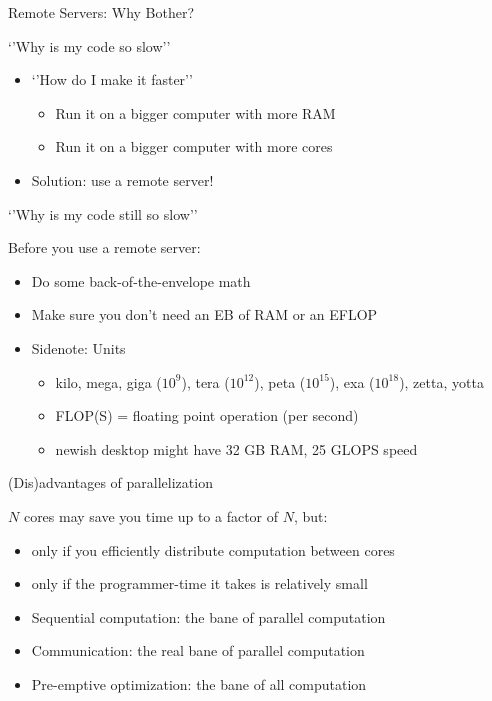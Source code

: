 \documentclass[ignorenonframetext,]{beamer}
\providecommand{\tightlist}{%
  \setlength{\itemsep}{0pt}\setlength{\parskip}{0pt}}
\begin{document}
\begin{frame}{Remote Servers: Why Bother?}
\begin{block}{`'Why is my code so slow''}
\begin{itemize}[<+->]
  \begin{itemize}[<+->]
  \tightlist
  \item
    You've run out of RAM
  \item
    Your computer just has too many operations to do
  \end{itemize}
\item
  `'How do I make it faster''

  \begin{itemize}[<+->]
  \tightlist
  \item
    Run it on a bigger computer with more RAM
  \item
    Run it on a bigger computer with more cores
  \end{itemize}
\item
  Solution: use a remote server!
\end{itemize}

\end{block}

\begin{block}{`'Why is my code still so slow''}

Before you use a remote server:

\begin{itemize}[<+->]
\tightlist
\item
  Do some back-of-the-envelope math
\item
  Make sure you don't need an EB of RAM or an EFLOP
\item
  Sidenote: Units

  \begin{itemize}[<+->]
  \tightlist
  \item
    kilo, mega, giga (\(10^9\)), tera (\(10^{12}\)), peta (\(10^{15}\)),
    exa (\(10^{18}\)), zetta, yotta
  \item
    FLOP(S) = floating point operation (per second)
  \item
    newish desktop might have 32 GB RAM, 25 GLOPS speed
  \end{itemize}
\end{itemize}

\end{block}

\begin{block}{(Dis)advantages of parallelization}

\(N\) cores may save you time up to a factor of \(N\), but:

\begin{itemize}[<+->]
\item
  only if you efficiently distribute computation between cores
\item
  only if the programmer-time it takes is relatively small
\item
  Sequential computation: the bane of parallel computation
\item
  Communication: the real bane of parallel computation
\item
  Pre-emptive optimization: the bane of all computation
\end{itemize}


\end{block}
\end{frame}
\end{document}
